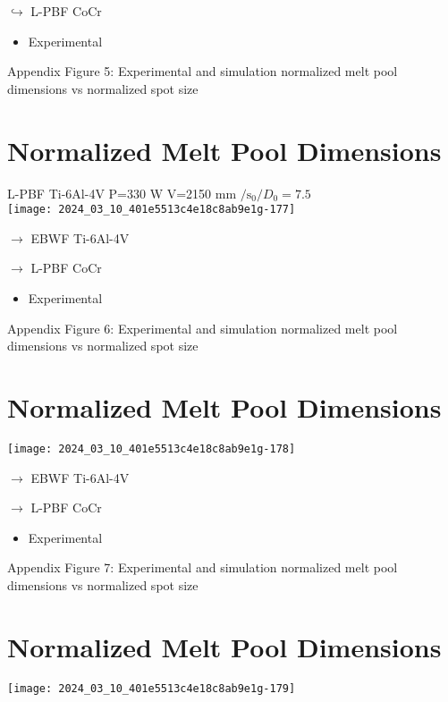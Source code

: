 \documentclass[10pt]{article}
\begin{document}
$\hookrightarrow$ L-PBF CoCr

\begin{itemize}
  \item Experimental
\end{itemize}

Appendix Figure 5: Experimental and simulation normalized melt pool dimensions vs normalized spot size

\section*{Normalized Melt Pool Dimensions}
L-PBF Ti-6Al-4V P=330 W V=2150 mm $/ \mathrm{s}_{0} / D_{0}=7.5$\\
\texttt{[image: 2024\_03\_10\_401e5513c4e18c8ab9e1g-177]}

$\longrightarrow$ EBWF Ti-6Al-4V

$\rightarrow$ L-PBF CoCr

\begin{itemize}
  \item Experimental
\end{itemize}

Appendix Figure 6: Experimental and simulation normalized melt pool dimensions vs normalized spot size

\section*{Normalized Melt Pool Dimensions}
\begin{center}
\texttt{[image: 2024\_03\_10\_401e5513c4e18c8ab9e1g-178]}
\end{center}

$\longrightarrow$ EBWF Ti-6Al-4V

$\rightarrow$ L-PBF CoCr

\begin{itemize}
  \item Experimental
\end{itemize}

Appendix Figure 7: Experimental and simulation normalized melt pool dimensions vs normalized spot size

\section*{Normalized Melt Pool Dimensions}
\begin{center}
\texttt{[image: 2024\_03\_10\_401e5513c4e18c8ab9e1g-179]}
\end{center}
\end{document}
